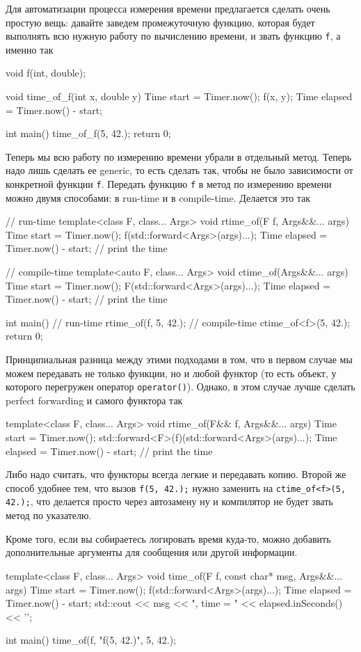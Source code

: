 Для автоматизации процесса измерения времени предлагается сделать очень простую вещь: давайте заведем промежуточную функцию, которая будет выполнять всю нужную работу по вычислению времени, и звать функцию \verb"f", а именно так
\begin{cppcode}
void f(int, double);

void time_of_f(int x, double y) {
  Time start = Timer.now();
  f(x, y);
  Time elapsed = Timer.now() - start;
}

int main() {
  time_of_f(5, 42.);
  return 0;
}
\end{cppcode}
Теперь мы всю работу по измерению времени убрали в отдельный метод.
Теперь надо лишь сделать ее generic, то есть сделать так, чтобы не было зависимости от конкретной функции \verb"f".
Передать функцию \verb"f" в метод по измерению времени можно двумя способами: в run-time и в compile-time.
Делается это так
\begin{cppcode}
// run-time
template<class F, class... Args>
void rtime_of(F f, Args&&... args) {
  Time start = Timer.now();
  f(std::forward<Args>(args)...);
  Time elapsed = Timer.now() - start;
  // print the time
}

// compile-time
template<auto F, class... Args>
void ctime_of(Args&&... args) {
  Time start = Timer.now();
  F(std::forward<Args>(args)...);
  Time elapsed = Timer.now() - start;
  // print the time
}

int main() {
  // run-time
  rtime_of(f, 5, 42.);
  // compile-time
  ctime_of<f>(5, 42.);
  return 0;
}
\end{cppcode}
Принципиальная разница между этими подходами в том, что в первом случае мы можем передавать не только функции, но и любой функтор (то есть объект, у которого перегружен оператор \verb"operator()").
Однако, в этом случае лучше сделать perfect forwarding и самого функтора так
\begin{cppcode}
template<class F, class... Args>
void rtime_of(F&& f, Args&&... args) {
  Time start = Timer.now();
  std::forward<F>(f)(std::forward<Args>(args)...);
  Time elapsed = Timer.now() - start;
  // print the time
}
\end{cppcode}
Либо надо считать, что функторы всегда легкие и передавать копию.
Второй же способ удобнее тем, что вызов \verb"f(5, 42.);" нужно заменить на \verb"ctime_of<f>(5, 42.);", что делается просто через автозамену ну и компилятор не будет звать метод по указателю.

Кроме того, если вы собираетесь логировать время куда-то, можно добавить дополнительные аргументы для сообщения или другой информации.
\begin{cppcode}
template<class F, class... Args>
void time_of(F f, const char* msg, Args&&... args) {
  Time start = Timer.now();
  f(std::forward<Args>(args)...);
  Time elapsed = Timer.now() - start;
  std::cout << msg << ", time = " << elapsed.inSeconds() << '\n';
}

int main() {
  time_of(f, "f(5, 42.)", 5, 42.);
}
\end{cppcode}

